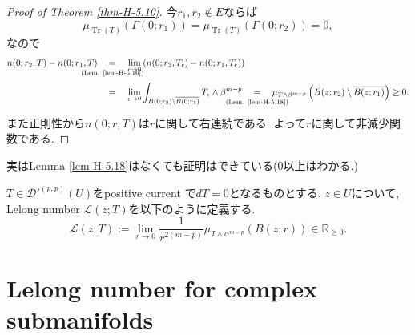 \begin{proof}[Proof of Theorem \ref{thm-H-5.10}]
今$r_1,r_2\notin E$ならば
\begin{equation*}
\mu_{\operatorname{Tr}(T)}(\Gamma(0;r_1))
=
\mu_{\operatorname{Tr}(T)}(\Gamma(0;r_2))
=
0,
\end{equation*}
なので
\begin{align*}
n(0;r_2,T)-n(0;r_1,T)
&\underalign{\text{(Lem. \ref{lem-H-5.16})}}{=}
\lim_{\epsilon\to0}
\left(
n(0;r_2,T_\epsilon)-n(0;r_1,T_\epsilon)
\right)\\
&\underalign{\text{}}{=}
\lim_{\epsilon\to0}
\int_{B(0;r_2)\setminus\overline{B(0;r_1)}}
T_\epsilon\wedge\beta^{m-p}
\underalign{\text{(Lem. \ref{lem-H-5.18})}}{=}
\mu_{T\wedge\beta^{m-p}}
\left(
B(z;r_2)\setminus\overline{B(z;r_1)}
\right)
\geq0.
\end{align*}
また正則性から$n(0;r,T)$は$r$に関して右連続である. よって$r$に関して非減少関数である. 
\end{proof}
実はLemma \ref{lem-H-5.18}はなくても証明はできている(0以上はわかる.)

\begin{tcolorbox}[mybox]
\begin{defn}
\label{defn-H-5.19}
$T\in\mathcal{D}'^{(p,p)}(U)$をpositive current で$dT=0$となるものとする. 
$z\in U$について, Lelong number $\mathcal{L}(z;T)$を以下のように定義する. 
\begin{equation*}
\mathcal{L}(z;T)
:=
\lim_{r\to0}
\frac{1}{r^{2(m-p)}}
\mu_{T\wedge\alpha^{m-p}}(B(z;r))
\in\mathbb{R}_{\geq0}.
\end{equation*}
\end{defn}
\end{tcolorbox}



\section{Lelong number for complex submanifolds}
\label{sec-H-0925}

